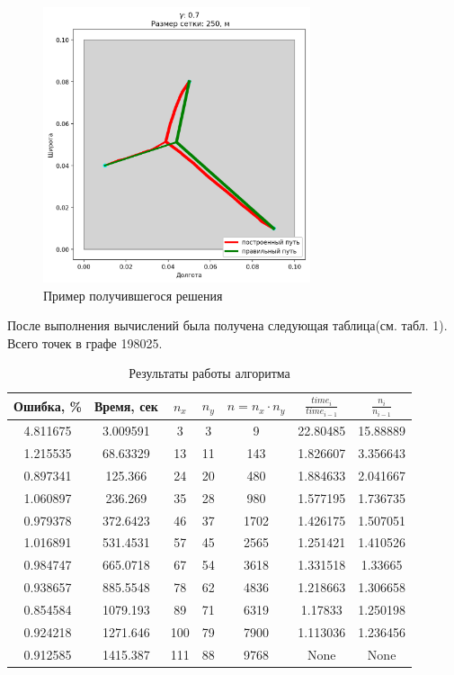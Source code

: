 \begin{figure}[H]
	\includegraphics[width=0.7\textwidth]{images/4_3.png}
	\caption{Пример получившегося решения}
\end{figure}
\vskip 4mm


После выполнения вычислений была получена следующая таблица(см. табл. 1). Всего точек в графе 198025.

\begin{table}[H]
	\centering
	\caption{Результаты работы алгоритма}
	\begin{tabular}{|c|c|c|c|c|c|c|}
		\hline
		\textbf{Ошибка, \%} & \textbf{Время, сек} &	\textbf{$n_x$} &	\textbf{$n_y$} & \textbf{$n = n_x  \cdot n_y$} & \textbf{$\frac{time_{i}}{time_{i-1}}$} &	\textbf{$\frac{n_i}{n_{i-1}}$}   \\ \hline
		4.811675 &	3.009591 &	3 &	3 &	9 &	22.80485 &	15.88889 \\ \hline
		1.215535 &	68.63329 &	13 & 11 &	143 &	1.826607 &	3.356643 \\ \hline
		0.897341 &	125.366 &	24 & 20 &	480 &	1.884633 &	2.041667 \\ \hline
		1.060897 &	236.269 &	35 & 28 &	980 &	1.577195 &	1.736735 \\ \hline
		0.979378 &	372.6423 &	46 & 37 &	1702 &	1.426175 &	1.507051 \\ \hline
		1.016891 &	531.4531 &	57 & 45 &	2565 &	1.251421 &	1.410526 \\ \hline
		0.984747 &	665.0718 &	67 & 54 &	3618 &	1.331518 &	1.33665 \\ \hline
		0.938657 &	885.5548 &	78 & 62 &	4836 &	1.218663 &	1.306658 \\ \hline
		0.854584 &	1079.193 &	89 & 71 &	6319 &	1.17833 &	1.250198 \\ \hline
		0.924218 &	1271.646 &	100 & 79 &	7900 &	1.113036 &	1.236456 \\ \hline
		0.912585 &	1415.387 &	111	& 88 &	9768 &	None &	None \\ \hline
	\end{tabular}
\end{table}
\vspace{4mm}

